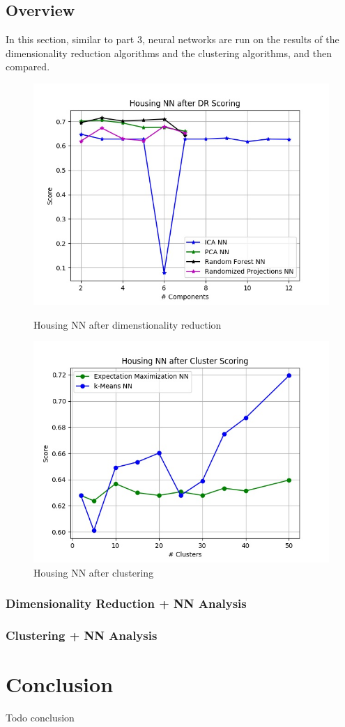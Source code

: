 \documentclass[h]{article}
\begin{document}
\subsection*{Overview}
In this section, similar to part 3, neural networks are run on the results of the 
dimensionality reduction algorithms and the clustering algorithms, and then compared.

 \begin{figure}[H]
      \includegraphics[width=1\textwidth,keepaspectratio]{housing_nn_after_dr_scoring.jpg} 
      \caption*{Housing NN after dimenstionality reduction } 
   \endminipage\hfill
      \includegraphics[width=1\textwidth,keepaspectratio]{housing_nn_after_cluster_scoring.jpg} 
      \caption*{Housing NN after clustering} 
   \endminipage\hfill
\end{figure}

\subsubsection*{Dimensionality Reduction + NN Analysis}

\subsubsection*{Clustering + NN Analysis}

\section*{Conclusion}  
Todo conclusion
\end{document}
